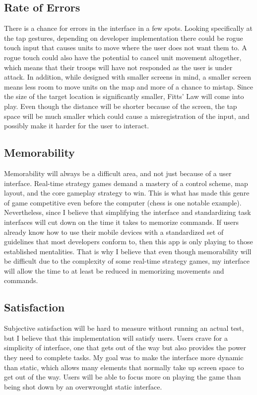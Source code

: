 \documentclass[11pt]{article}
\begin{document}
	\subsection{Rate of Errors}
	There is a chance for errors in the interface in a few spots. Looking specifically at the tap gestures, depending on developer implementation there could be rogue touch input that causes units to move where the user does not want them to. A rogue touch could also have the potential to cancel unit movement altogether, which means that their troops will have not responded as the user is under attack. In addition, while designed with smaller screens in mind, a smaller screen means less room to move units on the map and more of a chance to mistap. Since the size of the target location is significantly smaller, Fitts' Law will come into play. Even though the distance will be shorter because of the screen, the tap space will be much smaller which could cause a misregistration of the input, and possibly make it harder for the user to interact.
	\subsection{Memorability}
	Memorability will always be a difficult area, and not just because of a user interface. Real-time strategy games demand a mastery of a control scheme, map layout, and the core gameplay strategy to win. This is what has made this genre of game competitive even before the computer (chess is one notable example). Nevertheless, since I believe that simplifying the interface and standardizing task interfaces will cut down on the time it takes to memorize commands. If users already know how to use their mobile devices with a standardized set of guidelines that most developers conform to, then this app is only playing to those established mentalities. That is why I believe that even though memorability will be difficult due to the complexity of some real-time strategy games, my interface will allow the time to at least be reduced in memorizing movements and commands.
	\subsection{Satisfaction}
	Subjective satisfaction will be hard to measure without running an actual test, but I believe that this implementation will satisfy users. Users crave for a simplicity of interface, one that gets out of the way but also provides the power they need to complete tasks. My goal was to make the interface more dynamic than static, which allows many elements that normally take up screen space to get out of the way. Users will be able to focus more on playing the game than being shot down by an overwrought static interface.
\end{document}
